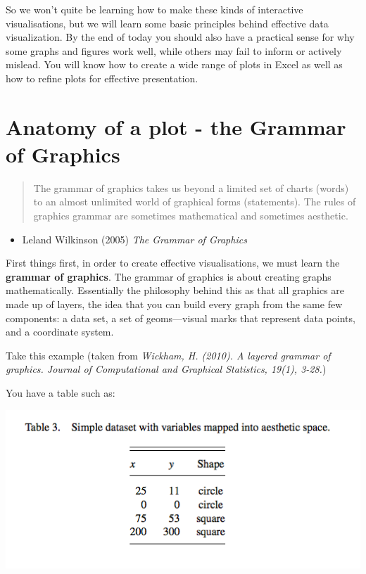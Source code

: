 \documentclass[
]{book}
\providecommand{\tightlist}{%
  \setlength{\itemsep}{0pt}\setlength{\parskip}{0pt}}
\begin{document}
So we won't quite be learning how to make these kinds of interactive visualisations, but we will learn some basic principles behind effective data visualization. By the end of today you should also have a practical sense for why some graphs and figures work well, while others may fail to inform or actively mislead. You will know how to create a wide range of plots in Excel as well as how to refine plots for effective presentation.

\hypertarget{anatomy-of-a-plot---the-grammar-of-graphics}{%
\section{Anatomy of a plot - the Grammar of Graphics}\label{anatomy-of-a-plot---the-grammar-of-graphics}}

\begin{quote}
The grammar of graphics takes us beyond a limited set
of charts (words) to an almost unlimited world of graphical forms (statements).
The rules of graphics grammar are sometimes mathematical and
sometimes aesthetic.
\end{quote}

\begin{itemize}
\tightlist
\item
  Leland Wilkinson (2005) \emph{The Grammar of Graphics}
\end{itemize}

First things first, in order to create effective visualisations, we must learn the \textbf{grammar of graphics}. The grammar of graphics is about creating graphs mathematically. Essentially the philosophy behind this as that all graphics are made up of layers, the idea that you can build every graph from the same few components: a data set, a set of geoms---visual marks that represent data points, and a coordinate system.

Take this example (taken from \emph{Wickham, H. (2010). A layered grammar of graphics. Journal of Computational and Graphical Statistics, 19(1), 3-28.})

You have a table such as:

\includegraphics{imgs/table.png}
\end{document}
